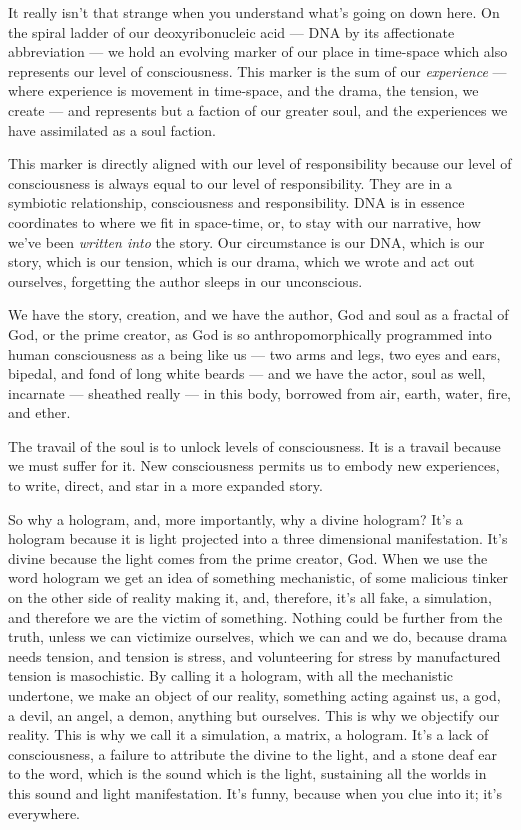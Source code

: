 It really isn't that strange when you understand what's going on down
here. On the spiral ladder of our deoxyribonucleic acid --- DNA by its
affectionate abbreviation --- we hold an evolving marker of our place in
time-space which also represents our level of consciousness. This marker
is the sum of our \emph{experience} --- where experience is movement in
time-space, and the drama, the tension, we create --- and represents but
a faction of our greater soul, and the experiences we have assimilated
as a soul faction.

This marker is directly aligned with our level of responsibility because
our level of consciousness is always equal to our level of
responsibility. They are in a symbiotic relationship, consciousness and
responsibility. DNA is in essence coordinates to where we fit in
space-time, or, to stay with our narrative, how we've been \emph{written
into} the story. Our circumstance is our DNA, which is our story, which
is our tension, which is our drama, which we wrote and act out
ourselves, forgetting the author sleeps in our unconscious.

We have the story, creation, and we have the author, God and soul as a
fractal of God, or the prime creator, as God is so anthropomorphically
programmed into human consciousness as a being like us --- two arms and
legs, two eyes and ears, bipedal, and fond of long white beards --- and
we have the actor, soul as well, incarnate --- sheathed really --- in
this body, borrowed from air, earth, water, fire, and ether.

The travail of the soul is to unlock levels of consciousness. It is a
travail because we must suffer for it. New consciousness permits us to
embody new experiences, to write, direct, and star in a more expanded
story.

So why a hologram, and, more importantly, why a divine hologram? It's a
hologram because it is light projected into a three dimensional
manifestation. It's divine because the light comes from the prime
creator, God. When we use the word hologram we get an idea of something
mechanistic, of some malicious tinker on the other side of reality
making it, and, therefore, it's all fake, a simulation, and therefore we
are the victim of something. Nothing could be further from the truth,
unless we can victimize ourselves, which we can and we do, because drama
needs tension, and tension is stress, and volunteering for stress by
manufactured tension is masochistic. By calling it a hologram, with all
the mechanistic undertone, we make an object of our reality, something
acting against us, a god, a devil, an angel, a demon, anything but
ourselves. This is why we objectify our reality. This is why we call it
a simulation, a matrix, a hologram. It's a lack of consciousness, a
failure to attribute the divine to the light, and a stone deaf ear to
the word, which is the sound which is the light, sustaining all the
worlds in this sound and light manifestation. It's funny, because when
you clue into it; it's everywhere.


